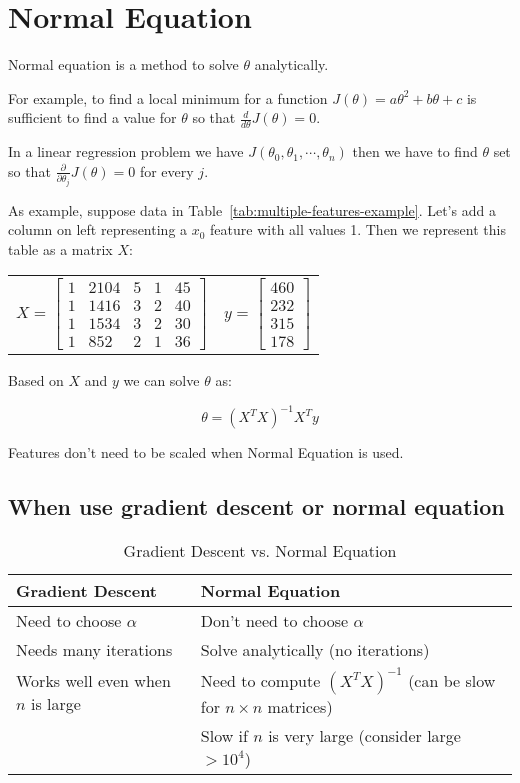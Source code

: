 \documentclass[a4paper]{article}
\begin{document}
\section{Normal Equation}

Normal equation is a method to solve $\theta$ analytically.

For example, to find a local minimum for a function $J(\theta) = a\theta^2 + b\theta + c$ is sufficient to find a value for $\theta$ so that $\frac{d}{d\theta}J(\theta) = 0$.

In a linear regression problem we have $J(\theta_0, \theta_1, \cdots, \theta_n)$ then we have to find $\theta$ set so that $\frac{\partial}{\partial\theta_j}J(\theta) = 0$ for every $j$.

As example, suppose data in Table~\ref{tab:multiple-features-example}. Let's add a column on left representing a $x_0$ feature with all values 1. Then we represent this table as a matrix $X$:

\begin{center}
\begin{tabular}{cc}
$X = \left[ \begin{array}{ccccc}
1 & 2104 & 5 & 1 & 45 \\
1 & 1416 & 3 & 2 & 40 \\
1 & 1534 & 3 & 2 & 30 \\
1 & 852  & 2 & 1 & 36
\end{array} \right]$ &
$y = \left[ \begin{array}{c}
460 \\ 232 \\ 315 \\  178 \end{array} \right]$
\end{tabular}
\end{center}

Based on $X$ and $y$ we can solve $\theta$ as:

$$
\theta = (X^T X)^{-1} X^T y
$$

Features don't need to be scaled when Normal Equation is used.

\subsection{When use gradient descent or normal equation}

\begin{table}[H]
\centering
\begin{tabular}{|l|l|}
\hline
\textbf{Gradient Descent} & \textbf{Normal Equation} \\
\hline
Need to choose $\alpha$ & Don't need to choose $\alpha$ \\
Needs many iterations & Solve analytically (no iterations) \\
Works well even when $n$ is large & Need to compute $(X^T X)^{-1}$ (can be slow for $n\times n$ matrices) \\
& Slow if $n$ is very large (consider large $> 10^4$) \\
\hline
\end{tabular}
\caption{Gradient Descent vs. Normal Equation}
\label{tab:gradient-descent-normal-equation}
\end{table}
\end{document}
